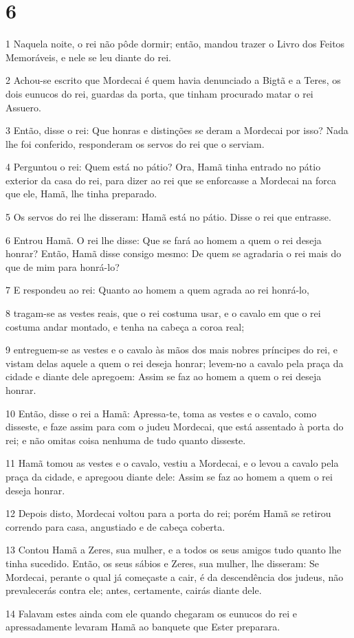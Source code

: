 \chapter{6}

\par 1 Naquela noite, o rei não pôde dormir; então, mandou trazer o Livro dos Feitos Memoráveis, e nele se leu diante do rei.
\par 2 Achou-se escrito que Mordecai é quem havia denunciado a Bigtã e a Teres, os dois eunucos do rei, guardas da porta, que tinham procurado matar o rei Assuero.
\par 3 Então, disse o rei: Que honras e distinções se deram a Mordecai por isso? Nada lhe foi conferido, responderam os servos do rei que o serviam.
\par 4 Perguntou o rei: Quem está no pátio? Ora, Hamã tinha entrado no pátio exterior da casa do rei, para dizer ao rei que se enforcasse a Mordecai na forca que ele, Hamã, lhe tinha preparado.
\par 5 Os servos do rei lhe disseram: Hamã está no pátio. Disse o rei que entrasse.
\par 6 Entrou Hamã. O rei lhe disse: Que se fará ao homem a quem o rei deseja honrar? Então, Hamã disse consigo mesmo: De quem se agradaria o rei mais do que de mim para honrá-lo?
\par 7 E respondeu ao rei: Quanto ao homem a quem agrada ao rei honrá-lo,
\par 8 tragam-se as vestes reais, que o rei costuma usar, e o cavalo em que o rei costuma andar montado, e tenha na cabeça a coroa real;
\par 9 entreguem-se as vestes e o cavalo às mãos dos mais nobres príncipes do rei, e vistam delas aquele a quem o rei deseja honrar; levem-no a cavalo pela praça da cidade e diante dele apregoem: Assim se faz ao homem a quem o rei deseja honrar.
\par 10 Então, disse o rei a Hamã: Apressa-te, toma as vestes e o cavalo, como disseste, e faze assim para com o judeu Mordecai, que está assentado à porta do rei; e não omitas coisa nenhuma de tudo quanto disseste.
\par 11 Hamã tomou as vestes e o cavalo, vestiu a Mordecai, e o levou a cavalo pela praça da cidade, e apregoou diante dele: Assim se faz ao homem a quem o rei deseja honrar.
\par 12 Depois disto, Mordecai voltou para a porta do rei; porém Hamã se retirou correndo para casa, angustiado e de cabeça coberta.
\par 13 Contou Hamã a Zeres, sua mulher, e a todos os seus amigos tudo quanto lhe tinha sucedido. Então, os seus sábios e Zeres, sua mulher, lhe disseram: Se Mordecai, perante o qual já começaste a cair, é da descendência dos judeus, não prevalecerás contra ele; antes, certamente, cairás diante dele.
\par 14 Falavam estes ainda com ele quando chegaram os eunucos do rei e apressadamente levaram Hamã ao banquete que Ester preparara.

